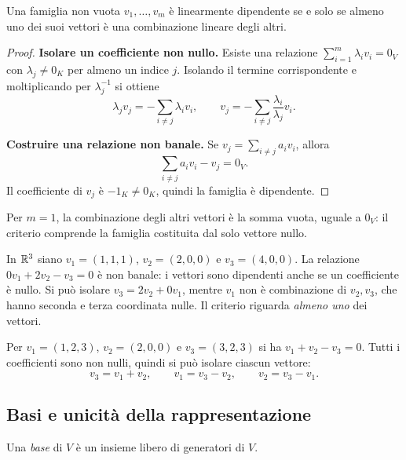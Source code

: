 \begin{teorema}
Una famiglia non vuota $v_1,\ldots,v_m$ è linearmente dipendente se e solo se almeno uno dei suoi vettori è una combinazione lineare degli altri.
\end{teorema}
\begin{proof}
\passomath{\Rightarrow}\textbf{Isolare un coefficiente non nullo.} Esiste una relazione $\sum_{i=1}^m\lambda_iv_i=0_V$ con $\lambda_j\ne0_K$ per almeno un indice $j$. Isolando il termine corrispondente e moltiplicando per $\lambda_j^{-1}$ si ottiene
\[
  \lambda_jv_j=-\sum_{i\ne j}\lambda_i v_i,
  \qquad
  v_j=-\sum_{i\ne j}\frac{\lambda_i}{\lambda_j}v_i.
\]

\passomath{\Leftarrow}\textbf{Costruire una relazione non banale.} Se $v_j=\sum_{i\ne j}a_iv_i$, allora
\[
  \sum_{i\ne j}a_iv_i-v_j=0_V.
\]
Il coefficiente di $v_j$ è $-1_K\ne0_K$, quindi la famiglia è dipendente.
\end{proof}

Per $m=1$, la combinazione degli altri vettori è la somma vuota, uguale a $0_V$: il criterio comprende la famiglia costituita dal solo vettore nullo.

\begin{esempio}
In $\mathbb{R}^3$ siano $v_1=(1,1,1)$, $v_2=(2,0,0)$ e $v_3=(4,0,0)$. La relazione $0v_1+2v_2-v_3=0$ è non banale: i vettori sono dipendenti anche se un coefficiente è nullo. Si può isolare $v_3=2v_2+0v_1$, mentre $v_1$ non è combinazione di $v_2,v_3$, che hanno seconda e terza coordinata nulle. Il criterio riguarda \emph{almeno uno} dei vettori.
\end{esempio}

\begin{esempio}
Per $v_1=(1,2,3)$, $v_2=(2,0,0)$ e $v_3=(3,2,3)$ si ha $v_1+v_2-v_3=0$. Tutti i coefficienti sono non nulli, quindi si può isolare ciascun vettore:
\[
  v_3=v_1+v_2,\qquad v_1=v_3-v_2,\qquad v_2=v_3-v_1.
\]
\end{esempio}

\subsection{Basi e unicità della rappresentazione}

\begin{definizione}
Una \emph{base} di $V$ è un insieme libero di generatori di $V$.
\end{definizione}

